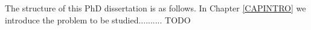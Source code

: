 The structure of this PhD dissertation is as follows. In Chapter \ref{CAPINTRO} we introduce the problem to be studied.......... TODO





